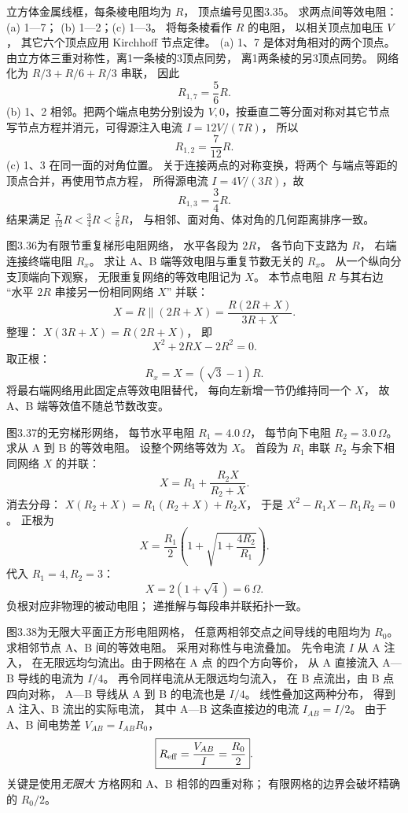 立方体金属线框，每条棱电阻均为 $R$，
顶点编号见图3.35。
求两点间等效电阻：(a) 1—7；
(b) 1—2；(c) 1—3。
\exsolution
将每条棱看作 $R$ 的电阻，
以相关顶点加电压 $V$，
其它六个顶点应用 Kirchhoff 节点定律。
(a) 1、7 是体对角相对的两个顶点。
由立方体三重对称性，离1一条棱的3顶点同势，
离1两条棱的另3顶点同势。
网络化为
$R/3+R/6+R/3$ 串联，
因此
\[
\boxed{R_{1,7}=\frac56R}.
\]
(b) 1、2 相邻。把两个端点电势分别设为
$V,0$，按垂直二等分面对称对其它节点
写节点方程并消元，可得源注入电流
$I=12V/(7R)$，
所以
\[
\boxed{R_{1,2}=\frac7{12}R}.
\]
(c) 1、3 在同一面的对角位置。
关于连接两点的对称变换，将两个
与端点等距的顶点合并，再使用节点方程，
所得源电流 $I=4V/(3R)$，故
\[
\boxed{R_{1,3}=\frac34R}.
\]
\excheck 结果满足
$\frac7{12}R<\frac34R<\frac56R$，
与相邻、面对角、体对角的几何距离排序一致。

图3.36为有限节重复梯形电阻网络，
水平各段为 $2R$，
各节向下支路为 $R$，
右端连接终端电阻 $R_x$。
求让 A、B 端等效电阻与重复节数无关的 $R_x$。
\exsolution
从一个纵向分支顶端向下观察，
无限重复网络的等效电阻记为 $X$。
本节点电阻 $R$ 与其右边
“水平 $2R$ 串接另一份相同网络 $X$”
并联：
\[
X=R\parallel(2R+X)
=\frac{R(2R+X)}{3R+X}.
\]
整理：
$X(3R+X)=R(2R+X)$，
即
\[
X^2+2RX-2R^2=0.
\]
取正根：
\[
\boxed{R_x=X=(\sqrt3-1)R}.
\]
\excheck 将最右端网络用此固定点等效电阻替代，
每向左新增一节仍维持同一个 $X$，
故 A、B 端等效值不随总节数改变。

图3.37的无穷梯形网络，
每节水平电阻
$R_1=4.0\,\Omega$，
每节向下电阻
$R_2=3.0\,\Omega$。
求从 A 到 B 的等效电阻。
\exsolution
设整个网络等效为 $X$。
首段为 $R_1$ 串联
$R_2$ 与余下相同网络 $X$ 的并联：
\[
X=R_1+\frac{R_2X}{R_2+X}.
\]
消去分母：
$X(R_2+X)=R_1(R_2+X)+R_2X$，
于是
$X^2-R_1X-R_1R_2=0$。
正根为
\[
\boxed{X=\frac{R_1}{2}
\left(1+\sqrt{1+\frac{4R_2}{R_1}}\right)}.
\]
代入 $R_1=4,R_2=3$：
\[
\boxed{X=2(1+\sqrt4)=6\,\Omega}.
\]
\excheck 负根对应非物理的被动电阻；
递推解与每段串并联拓扑一致。

图3.38为无限大平面正方形电阻网格，
任意两相邻交点之间导线的电阻均为
$R_0$。求相邻节点 A、B 间的等效电阻。
\exsolution
采用对称性与电流叠加。
先令电流 $I$ 从 A 注入，
在无限远均匀流出。由于网格在 A 点
的四个方向等价，
从 A 直接流入 A—B 导线的电流为
$I/4$。
再令同样电流从无限远均匀流入，
在 B 点流出，由 B 点四向对称，
A—B 导线从 A 到 B 的电流也是 $I/4$。
线性叠加这两种分布，
得到 A 注入、B 流出的实际电流，
其中 A—B 这条直接边的电流
$I_{AB}=I/2$。
由于 A、B 间电势差
$V_{AB}=I_{AB}R_0$，
\[
\boxed{R_{\rm eff}=\frac{V_{AB}}{I}
=\frac{R_0}{2}}.
\]
\excheck 关键是使用\emph{无限大}
方格网和 A、B 相邻的四重对称；
有限网格的边界会破坏精确的 $R_0/2$。

